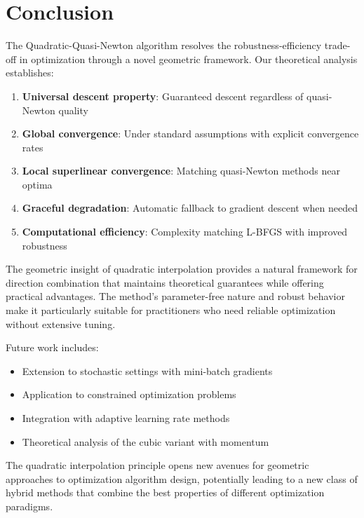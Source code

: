\hypertarget{conclusion}{%
\section{Conclusion}\label{conclusion}}

The Quadratic-Quasi-Newton algorithm resolves the robustness-efficiency trade-off in optimization through a novel geometric framework. Our theoretical analysis establishes:

\begin{enumerate}
\def\labelenumi{\arabic{enumi}.}
\tightlist
\item
  \textbf{Universal descent property}: Guaranteed descent regardless of quasi-Newton quality
\item
  \textbf{Global convergence}: Under standard assumptions with explicit convergence rates
\item
  \textbf{Local superlinear convergence}: Matching quasi-Newton methods near optima
\item
  \textbf{Graceful degradation}: Automatic fallback to gradient descent when needed
\item
  \textbf{Computational efficiency}: Complexity matching L-BFGS with improved robustness
\end{enumerate}

The geometric insight of quadratic interpolation provides a natural framework for direction combination that maintains theoretical guarantees while offering practical advantages. The method's parameter-free nature and robust behavior make it particularly suitable for practitioners who need reliable optimization without extensive tuning.

Future work includes:

\begin{itemize}
\tightlist
\item
  Extension to stochastic settings with mini-batch gradients
\item
  Application to constrained optimization problems
\item
  Integration with adaptive learning rate methods
\item
  Theoretical analysis of the cubic variant with momentum
\end{itemize}

The quadratic interpolation principle opens new avenues for geometric approaches to optimization algorithm design, potentially leading to a new class of hybrid methods that combine the best properties of different optimization paradigms.
